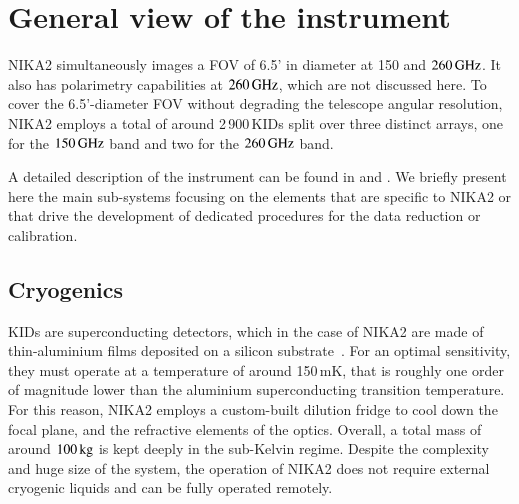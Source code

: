 \documentclass[traditionalabstract]{aa}
\newcommand{\lp}[1]{#1}
\begin{document}
\section{General view of the instrument}
\label{se:instru}
%

NIKA2 simultaneously images a FOV of
6.5' in diameter at 150 and $260\,\rm{GHz}$. It also has polarimetry
capabilities at  $260\,\rm{GHz}$, which are not discussed here. 
To cover the 6.5'-diameter FOV without degrading the
telescope angular resolution, NIKA2 employs a total of around
2\,900\,KIDs split over three distinct arrays, one for the $150\,\rm{GHz}$
band and two for the $260\,\rm{GHz}$ band.

A detailed description of the instrument can be found in
\citet{Adam2018} and \citet{Calvo2016JLTP}. We briefly present here the main sub-systems
focusing on the elements that are specific to NIKA2
or that drive the development of dedicated procedures for the data
reduction or calibration.

\subsection{Cryogenics}

{\lp KIDs are superconducting detectors, which in the case of NIKA2 are made of
thin-aluminium films deposited on a silicon substrate~\citep{Roesch2012_LEKID}.
For an optimal sensitivity, they must operate at a temperature of
around 150\,mK, that is roughly one order of magnitude lower than the
aluminium superconducting transition temperature.}  
For this reason,
NIKA2 employs a custom-built dilution fridge to cool down the focal plane, and the
refractive elements of the optics. Overall, a total mass of around
$100\, \rm{kg}$ is kept deeply in the sub-Kelvin regime. Despite the complexity
and huge size of the system, the operation of NIKA2 does not require
external cryogenic liquids and can be fully operated remotely.
\end{document}
